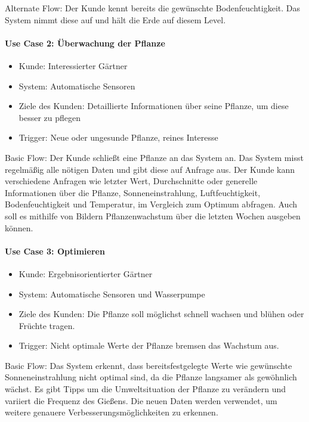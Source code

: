Alternate Flow:
Der Kunde kennt bereits die gewünschte Bodenfeuchtigkeit. Das System nimmt diese auf und hält die Erde auf diesem Level.

\paragraph{Use Case 2: Überwachung der Pflanze}
\begin{itemize}
    \item Kunde: Interessierter Gärtner
    \item System: Automatische Sensoren
    \item Ziele des Kunden: Detaillierte Informationen über seine Pflanze, um diese besser zu pflegen
    \item Trigger: Neue oder ungesunde Pflanze, reines Interesse
\end{itemize}

Basic Flow:
Der Kunde schließt eine Pflanze an das System an. Das System misst regelmäßig alle nötigen Daten und gibt diese auf Anfrage aus. Der Kunde kann verschiedene Anfragen wie letzter Wert, Durchschnitte oder generelle Informationen über die Pflanze, Sonneneinstrahlung, Luftfeuchtigkeit, Bodenfeuchtigkeit und Temperatur, im Vergleich zum Optimum abfragen. Auch soll es mithilfe von Bildern Pflanzenwachstum über die letzten Wochen ausgeben können.

\paragraph{Use Case 3: Optimieren}
\begin{itemize}
    \item Kunde: Ergebnisorientierter Gärtner
    \item System: Automatische Sensoren und Wasserpumpe
    \item Ziele des Kunden: Die Pflanze soll möglichst schnell wachsen und blühen oder Früchte tragen.
    \item Trigger: Nicht optimale Werte der Pflanze bremsen das Wachstum aus.
\end{itemize}

Basic Flow:
Das System erkennt, dass bereitsfestgelegte Werte wie gewünschte Sonneneinstrahlung nicht optimal sind, da die Pflanze langsamer als gewöhnlich wächst. Es gibt Tipps um die Umweltsituation der Pflanze zu verändern und variiert die Frequenz des Gießens. Die neuen Daten werden verwendet, um weitere genauere Verbesserungsmöglichkeiten zu erkennen.

